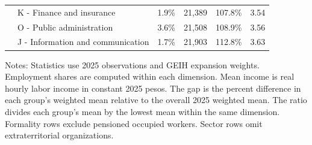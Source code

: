 \begin{table}[!htbp]
\begin{tabular}{lp{}rrrr}
           & K - Finance and insurance & 1.9\% & 21,389 & 107.8\% & 3.54 \\
           & O - Public administration & 3.6\% & 21,508 & 108.9\% & 3.56 \\
           & J - Information and communication & 1.7\% & 21,903 & 112.8\% & 3.63 \\
    \bottomrule
  \end{tabular}
  \vspace{0.3em}
  \begin{minipage}{0.95\textwidth}
  \footnotesize
  Notes: Statistics use 2025 observations and GEIH expansion weights. Employment shares are computed within each dimension. Mean income is real hourly labor income in constant 2025 pesos. The gap is the percent difference in each group's weighted mean relative to the overall 2025 weighted mean. The ratio divides each group's mean by the lowest mean within the same dimension. Formality rows exclude pensioned occupied workers. Sector rows omit extraterritorial organizations.
  \end{minipage}
\end{table}
